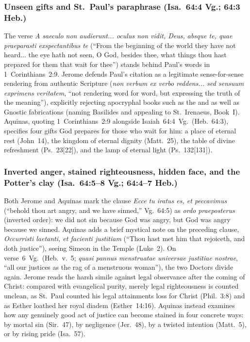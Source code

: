 \subsubsection{Unseen gifts and St.~Paul's paraphrase (Isa.~64:4 Vg.; 64:3 Heb.)}
The verse \emph{A saeculo non audierunt... oculus non vidit, Deus, absque te, quae praeparasti exspectantibus te} (``From the beginning of the world they have not heard... the eye hath not seen, O God, besides thee, what things thou hast prepared for them that wait for thee'') stands behind Paul's words in 1~Corinthians~2:9. Jerome defends Paul's citation as a legitimate sense-for-sense rendering from authentic Scripture (\emph{non verbum ex verbo reddens... sed sensuum exprimens veritatem}, ``not rendering word for word, but expressing the truth of the meaning''), explicitly rejecting apocryphal books such as the  and  as well as Gnostic fabrications (naming Basilides and appealing to St.~Irenaeus,  Book~I). Aquinas, quoting 1~Corinthians~2:9 alongside Isaiah~64:4~Vg.\ (Heb.~64:3), specifies four gifts God prepares for those who wait for him: a place of eternal rest (John~14), the kingdom of eternal dignity (Matt.~25), the table of divine refreshment (Ps.~23[22]), and the lamp of eternal light (Ps.~132[131]).

\subsubsection{Inverted anger, stained righteousness, hidden face, and the Potter's clay (Isa.~64:5--8 Vg.; 64:4--7 Heb.)}
Both Jerome and Aquinas mark the clause \emph{Ecce tu iratus es, et peccavimus} (``behold thou art angry, and we have sinned,'' Vg.~64:5) as \emph{ordo praeposterus} (inverted order): we did not sin because God was angry, but God was angry because we sinned. Aquinas adds a brief mystical note on the preceding clause, \emph{Occurristi laetanti, et facienti justitiam} (``Thou hast met him that rejoiceth, and doth justice''), seeing Simeon in the Temple (Luke~2). On verse~6~Vg.\ (Heb.~v.~5; \emph{quasi pannus menstruatae universae justitiae nostrae}, ``all our justices as the rag of a menstruous woman''), the two Doctors divide again. Jerome reads the harsh simile against legal observance after the coming of Christ: compared with evangelical purity, merely legal righteousness is counted unclean, as St.~Paul counted his legal attainments loss for Christ (Phil.~3:8) and as Esther loathed her royal diadem (Esther~14:16). Aquinas instead examines how any genuinely good act of justice can become stained in four concrete ways: by mortal sin (Sir.~47), by negligence (Jer.~48), by a twisted intention (Matt.~5), or by rising pride (Isa.~57).

